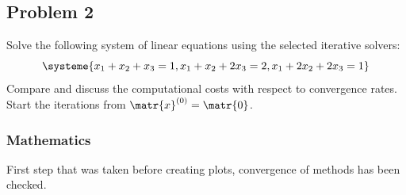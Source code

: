 \subsection{Problem 2}%
\label{sec:problem_2}
Solve the following system of linear equations using the selected iterative solvers:
\begin{equation*}
  \systeme{x_1+x_2+x_3=1,x_1+x_2+2x_3=2,x_1+2x_2+2x_3=1}
\end{equation*}
Compare and discuss the computational costs with respect to convergence rates.
Start the iterations from $\matr{x}^{(0)}=\matr{0}$.
\subsubsection*{Mathematics}
First step that was taken before creating plots, convergence of methods has been checked.
